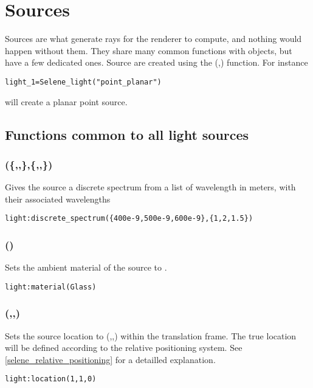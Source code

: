 \newpage
\section{Sources}

Sources are what generate rays for the renderer to compute, and nothing would happen without them. They share many common functions with objects, but have a few dedicated ones. Source are created using the (,) function. For instance
\begin{lstlisting}
light_1=Selene_light("point_planar")
\end{lstlisting}
will create a planar point source.

\subsection{Functions common to all light sources}

\label{selene_source_funcs}

\subsubsection[discrete\_spectrum]{(\{,,\},\{,,\})}

Gives the source a discrete spectrum from a list of wavelength in meters, with their associated wavelengths
\begin{lstlisting}
light:discrete_spectrum({400e-9,500e-9,600e-9},{1,2,1.5})
\end{lstlisting}

\subsubsection[material]{()}

Sets the ambient material of the source to .
\begin{lstlisting}
light:material(Glass)
\end{lstlisting}

\subsubsection[location]{(,,)}

Sets the source location to (,,) within the translation frame. The true location will be defined according to the relative positioning system. See \ref{selene_relative_positioning} for a detailled explanation.
\begin{lstlisting}
light:location(1,1,0)
\end{lstlisting}

